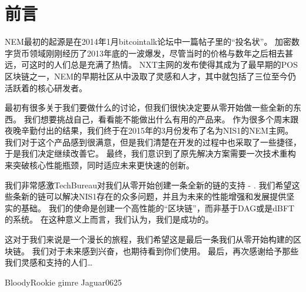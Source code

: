 \section*{前言}


NEM最初的起源是在2014年1月bitcointalk论坛中一篇帖子里的“投名状”。
加密数字货币领域刚刚经历了2013年底的一波爆发，尽管当时的价格与数年之后相去甚远，可这时的人们总是充满了热情。
NXT主网的发布使得其成为了最早期的POS区块链之一，NEM的早期社区从中汲取了灵感和人才，其中就包括了三位至今仍活跃着的核心研发者。

最初有很多关于我们要做什么的讨论，但我们很快决定要从零开始做一些全新的东西。
我们想要挑战自己，看看能不能做出什么有用的产品来。
作为很多个周末跟夜晚辛勤付出的结果，我们终于在2015年的3月份发布了名为NIS1的NEM主网。
我们对于这个产品感到很满意，但是我们清楚在开发的过程中也采取了一些捷径，于是我们决定继续改善它。
最终，我们意识到了原先解决方案需要一次技术重构来突破核心性能瓶颈，同时适应未来更快速的创新。

我们非常感激TechBureau对我们从零开始创建一条全新的链的支持 - \codename.
我们希望这些条新的链可以解决NIS1存在的众多问题，并且为未来的性能增强和发展提供坚实的基础。
我们的使命是创建一个高性能的“区块链”，而非基于DAG或是dBFT的系统。
在这种意义上而言，我们认为，我们是成功的。

这对于我们来说是一个漫长的旅程，我们希望这是最后一条我们从零开始构建的区块链。
我们对于未来感到兴奋，也期待看到你们使用。
最后，再次感谢给予那些我们灵感和支持的人们\ldots

\begin{flushright}
BloodyRookie
gimre
Jaguar0625
\end{flushright}
